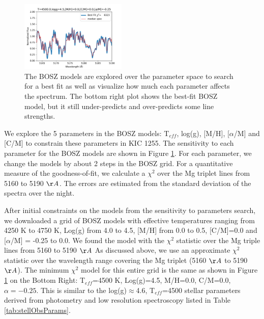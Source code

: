 \documentclass[preprint]{aastex61}
\newcommand{\shStar}{KIC 1255}
\begin{document}
\begin{figure}[!hbtp]
\begin{centering}
\includegraphics[width=0.45\textwidth]{images/bosz_model_exploration/FINAL_exploration.pdf}
\caption{The BOSZ models are explored over the parameter space to search for a best fit as well as visualize how much each parameter affects the spectrum.
The bottom right plot shows the best-fit BOSZ model, but it still under-predicts and over-predicts some line strengths.}\label{fig:boszModelParamsMedianSpec}
\end{centering}
\end{figure}

We explore the 5 parameters in the BOSZ models: T$_{eff}$, log(g), [M/H], [$\alpha$/M] and [C/M] to constrain these parameters in \shStar.
The sensitivity to each parameter for the BOSZ models are shown in Figure \ref{fig:boszModelParamsMedianSpec}.
For each parameter, we change the models by about 2 steps in the BOSZ grid.
For a quantitative measure of the goodness-of-fit, we calculate a $\chi^2$ over the Mg triplet lines from 5160 to 5190 $\AA$.
The errors are estimated from the standard deviation of the spectra over the night.


After initial constraints on the models from the sensitivity to parameters search, we downloaded a grid of BOSZ models with effective temperatures ranging from 4250 K to 4750 K, Log(g) from 4.0 to 4.5, [M/H] from 0.0 to 0.5, [C/M]=0.0 and [$\alpha$/M] = -0.25 to 0.0.
We found the model with the  $\chi^2$ statistic over the Mg triple lines from 5160 to 5190 $\AA$
As discussed above, we use an approximate $\chi^2$ statistic over the wavelength range covering the Mg triplet (5160 $\AA$ to 5190 $\AA$).
The minimum $\chi^2$ model for this entire grid is the same as shown in Figure \ref{fig:boszModelParamsMedianSpec} on the Bottom Right: T$_{eff}$=4500 K, Log(g)=4.5, M/H=0.0, C/M=0.0, $\alpha=-0.25$.
This is similar to the log(g)$\approx$4.6, T$_{eff}$=4500 stellar parameters derived from photometry and low resolution spectroscopy listed in Table \ref{tab:stellObsParams}.
\end{document}
